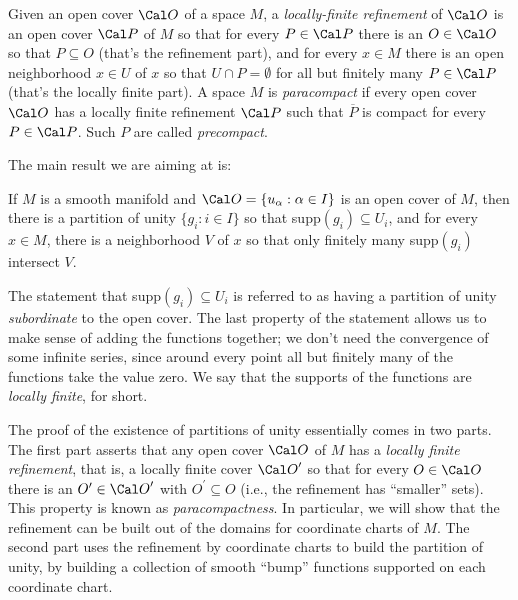 Given an open cover ${\Cal O}$ of a space $M$, a {\it locally-finite refinement} of ${\Cal O}$
is an open cover ${\Cal P}$ of $M$ so that for every $P\in{\Cal P}$ there is an $O\in{\Cal O}$
so that $P\subseteq O$ (that's the refinement part), and for every $x\in M$ there
is an open neighborhood $x\in U$ of $x$ so that $U\cap P=\emptyset$ for all but finitely many
$P\in {\Cal P}$ (that's the locally finite part). A space $M$ is {\it paracompact} if 
every open cover ${\Cal O}$ has a locally finite refinement ${\Cal P}$ such that $\overline{P}$ is compact
for every $P\in {\Cal P}$. Such $P$ are called {\it precompact}.

The main result we are aiming at is:

\ssk

If $M$ is a smooth manifold and ${\Cal O}=\{u_\alpha : \alpha\in I\}$ is an open cover of $M$, then there
is a partition of unity $\{g_i : i\in I\}$ so that supp$(g_i)\subseteq U_i$, and for every $x\in M$,
there is a neighborhood $V$ of $x$ so that only finitely many supp$(g_i)$ intersect $V$.

\ssk

The statement that supp$(g_i)\subseteq U_i$ is referred to as having a partition of unity
{\it subordinate} to the open cover.
The last property of the statement allows us to make sense of adding the functions together; we don't
need the convergence of some infinite series, since around every point all but finitely many of the
functions take the value zero. We say that the supports of the functions are {\it locally finite},
for short.

The proof of the existence of partitions of unity essentially comes in two parts. The first part
asserts that any open cover ${\Cal O}$ of $M$ has a {\it locally finite refinement}, that is, a 
locally finite cover ${\Cal O}^\prime$ so that for every $O\in {\Cal O}$ there is an 
$O^\prime\in{\Cal O}^\prime$ with $O^\prime\subseteq O$ (i.e., the refinement has ``smaller'' sets).
This property is known as {\it paracompactness}. In particular, we will show that the refinement
can be built out of the domains for coordinate charts of $M$. The second part uses the 
refinement by coordinate charts to build the partition of unity, by building a collection of 
smooth ``bump'' functions supported on each coordinate chart.

\ssk

